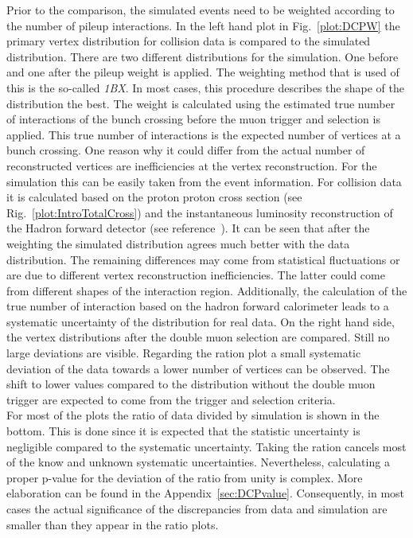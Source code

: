 Prior to the comparison, the simulated events need to be weighted according to the number of pileup interactions. In the left hand plot in Fig.~\ref{plot:DCPW} the primary vertex distribution for collision data is compared to the simulated distribution. There are two different distributions for the simulation. One before and one after the pileup weight is applied. The weighting method that is used of this is the so-called \textit{1BX}. In most cases, this procedure describes the shape of the distribution the best. The weight is calculated using the estimated true number of interactions of the bunch crossing before the muon trigger and selection is applied. This true number of interactions is the expected number of vertices at a bunch crossing. One reason why it could differ from the actual number of reconstructed vertices are inefficiencies at the vertex reconstruction. For the simulation this can be easily taken from the event information. For collision data it is calculated based on the proton proton cross section (see Rig.~\ref{plot:IntroTotalCross}) and the instantaneous luminosity reconstruction of the Hadron forward detector (see reference~). It can be seen that after the weighting the simulated distribution agrees much better with the data distribution. The remaining differences may come from statistical fluctuations or are due to different vertex reconstruction inefficiencies. The latter could come from different shapes of the interaction region. Additionally, the calculation of the true number of interaction based on the hadron forward calorimeter leads to a systematic uncertainty of the distribution for real data. On the right hand side, the vertex distributions after the double muon selection are compared. Still no large deviations are visible. Regarding the ration plot a small systematic deviation of the data towards a lower number of vertices can be observed.  The shift to lower values compared to the distribution without the double muon trigger are expected to come from the trigger and selection criteria. \\
For most of the plots the ratio of data divided by simulation is shown in the bottom. This is done since it is expected that the statistic uncertainty is negligible compared to the systematic uncertainty. Taking the ration cancels most of the know and unknown systematic uncertainties. Nevertheless, calculating a proper p-value for the deviation of the ratio from unity is complex. More elaboration can be found in the Appendix~\ref{sec:DCPvalue}. Consequently, in most cases the actual significance of the discrepancies from data and simulation are smaller than they appear in the ratio plots.

